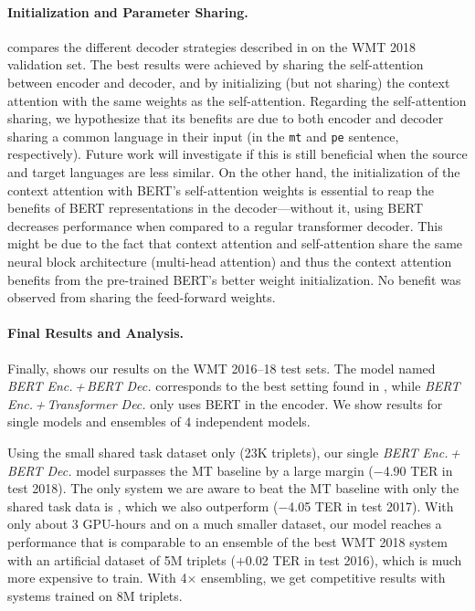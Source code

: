 \paragraph*{Initialization and Parameter Sharing.}
 compares the different decoder
strategies described in  on the WMT 2018
validation set. The best results were achieved by sharing the
self-attention between encoder and decoder, and by initializing (but
not sharing) the context attention with the same weights as the
self-attention. Regarding the self-attention sharing, we hypothesize
that its benefits are due to both encoder and decoder sharing a
common language in their input (in the {\tt mt} and {\tt pe}
sentence, respectively). Future work will investigate if this is
still beneficial when the source and target languages are less
similar. On the other hand, the initialization of the context
attention with BERT's self-attention weights is essential to reap the
benefits of BERT representations in the decoder---without it, using
BERT decreases performance when compared to a regular transformer
decoder. This might be due to the fact that context attention and
self-attention share the same neural block architecture (multi-head
attention) and thus the context attention benefits from the
pre-trained BERT's better weight initialization. No benefit was
observed from sharing the feed-forward weights.

\paragraph*{Final Results and Analysis.}
Finally,  shows our results on the WMT
2016--18 test sets. The model named \emph{BERT Enc.\,+\,BERT Dec.}
corresponds to the best setting found in
, while \emph{BERT Enc.\,+\,Transformer
  Dec.} only uses BERT in the encoder. We show results for single
models and ensembles of 4 independent models.

Using the small shared task dataset only (23K triplets), our single
\emph{BERT Enc.\,+\,BERT Dec.} model surpasses the MT baseline by a
large margin ($-$4.90 TER in test 2018). The only system we are aware
to beat the MT baseline with only the shared task data is
\citet{berard2017lig}, which we also outperform ($-$4.05 TER in test
2017). With only about 3 GPU-hours and on a much smaller dataset, our
model reaches a performance that is comparable to an ensemble of the
best WMT 2018 system with an artificial dataset of 5M triplets
($+$0.02 TER in test 2016), which is much more expensive to train.
With 4$\times$ ensembling, we get competitive results with systems
trained on 8M triplets.

